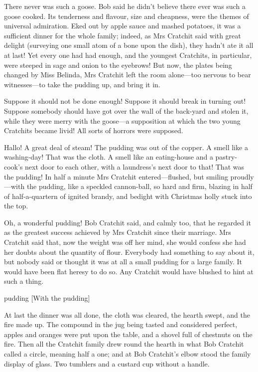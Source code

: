 There never was such a goose. Bob said he didn't believe there ever was such a
goose cooked. Its tenderness and flavour, size and cheapness, were the themes of
universal admiration. Eked out by apple sauce and mashed potatoes, it was a
sufficient dinner for the whole family; indeed, as Mrs Cratchit said with great
delight (surveying one small atom of a bone upon the dish), they hadn't ate it
all at last! Yet every one had had enough, and the youngest Cratchits, in
particular, were steeped in sage and onion to the eyebrows! But now, the plates
being changed by Miss Belinda, Mrs Cratchit left the room alone—too nervous to
bear witnesses—to take the pudding up, and bring it in.

Suppose it should not be done enough! Suppose it should break in turning out!
Suppose somebody should have got over the wall of the back-yard and stolen it,
while they were merry with the goose—a supposition at which the two young
Cratchits became livid! All sorts of horrors were supposed.

Hallo! A great deal of steam! The pudding was out of the copper. A smell like a
washing-day! That was the cloth. A smell like an eating-house and a
pastry-cook's next door to each other, with a laundress's next door to that!
That was the pudding! In half a minute Mrs Cratchit entered—flushed, but smiling
proudly—with the pudding, like a speckled cannon-ball, so hard and firm, blazing
in half of half-a-quartern of ignited brandy, and bedight with Christmas holly
stuck into the top.

Oh, a wonderful pudding! Bob Cratchit said, and calmly too, that he regarded it
as the greatest success achieved by Mrs Cratchit since their marriage. Mrs
Cratchit said that, now the weight was off her mind, she would confess she had
her doubts about the quantity of flour. Everybody had something to say about it,
but nobody said or thought it was at all a small pudding for a large family. It
would have been flat heresy to do so. Any Cratchit would have blushed to hint at
such a thing.

  \begin{bwbigpic}
    [\basicscale] 
    {pudding}
    [With the pudding]
  \end{bwbigpic}


At last the dinner was all done, the cloth was cleared, the hearth swept, and
the fire made up. The compound in the jug being tasted and considered perfect,
apples and oranges were put upon the table, and a shovel full of chestnuts on
the fire. Then all the Cratchit family drew round the hearth in what Bob
Cratchit called a circle, meaning half a one; and at Bob Cratchit's elbow stood
the family display of glass. Two tumblers and a custard cup without a handle.

